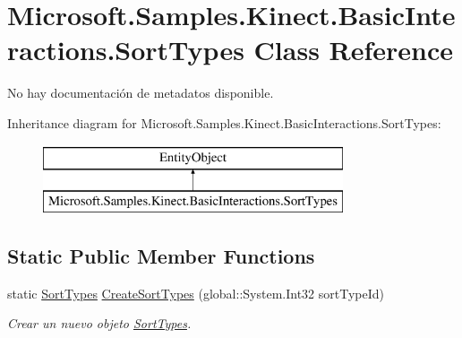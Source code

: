 \hypertarget{class_microsoft_1_1_samples_1_1_kinect_1_1_basic_interactions_1_1_sort_types}{\section{Microsoft.\-Samples.\-Kinect.\-Basic\-Interactions.\-Sort\-Types Class Reference}
\label{class_microsoft_1_1_samples_1_1_kinect_1_1_basic_interactions_1_1_sort_types}
}


No hay documentación de metadatos disponible.  


Inheritance diagram for Microsoft.\-Samples.\-Kinect.\-Basic\-Interactions.\-Sort\-Types\-:\begin{figure}[H]
\begin{center}
\leavevmode
\includegraphics[height=2.000000cm]{class_microsoft_1_1_samples_1_1_kinect_1_1_basic_interactions_1_1_sort_types}
\end{center}
\end{figure}
\subsection*{Static Public Member Functions}
\begin{DoxyCompactItemize}
\item 
static \hyperlink{class_microsoft_1_1_samples_1_1_kinect_1_1_basic_interactions_1_1_sort_types}{Sort\-Types} \hyperlink{class_microsoft_1_1_samples_1_1_kinect_1_1_basic_interactions_1_1_sort_types_a0dc330ed63e0eed800360097b9fb1ee9}{Create\-Sort\-Types} (global\-::\-System.\-Int32 sort\-Type\-Id)
\begin{DoxyCompactList}\small\item\em Crear un nuevo objeto \hyperlink{class_microsoft_1_1_samples_1_1_kinect_1_1_basic_interactions_1_1_sort_types}{Sort\-Types}. \end{DoxyCompactList}\end{DoxyCompactItemize}
